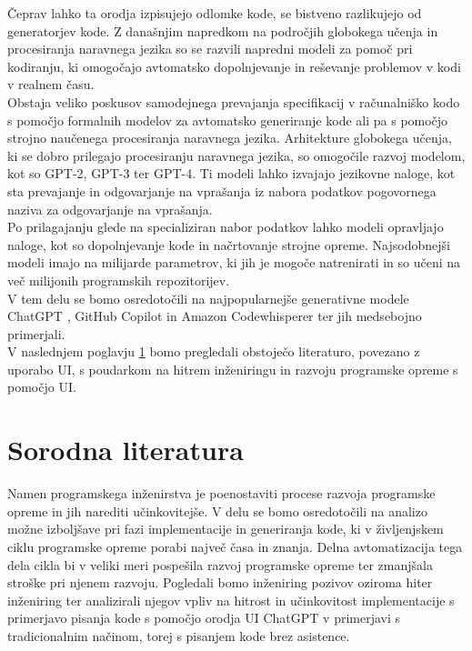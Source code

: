 \documentclass[a4paper,12pt,openright]{book}
\begin{document}
Čeprav lahko ta orodja izpisujejo odlomke kode, se bistveno razlikujejo od generatorjev kode.
Z današnjim napredkom na področjih globokega učenja in procesiranja naravnega jezika so se razvili napredni modeli za pomoč pri kodiranju, ki omogočajo avtomatsko dopolnjevanje in reševanje problemov v kodi v realnem času. \\
Obstaja veliko poskusov samodejnega prevajanja specifikacij v računalniško kodo s pomočjo formalnih modelov za avtomatsko generiranje kode ali pa s pomočjo strojno naučenega procesiranja naravnega jezika. Arhitekture globokega učenja, ki se dobro prilegajo procesiranju naravnega jezika, so omogočile razvoj modelom, kot so GPT-2, GPT-3 ter GPT-4. Ti modeli lahko izvajajo jezikovne naloge, kot sta prevajanje in odgovarjanje na vprašanja iz nabora podatkov pogovornega naziva za odgovarjanje na vprašanja. \cite{hu2019re} \\
Po prilagajanju glede na specializiran nabor podatkov lahko modeli opravljajo naloge, kot so dopolnjevanje kode in načrtovanje strojne opreme.  Najsodobnejši modeli imajo na milijarde parametrov, ki jih je mogoče natrenirati in so učeni na več milijonih programskih repozitorijev.  \cite{hu2019re} \\
V tem delu se bomo osredotočili na najpopularnejše generativne modele ChatGPT \cite{openai_chatgpt}, GitHub Copilot \cite{github_copilot} in Amazon Codewhisperer \cite{saasworthy_codewhisperer} ter jih medsebojno primerjali. \\
\pagebreak
V naslednjem poglavju \ref{char:lit} bomo pregledali obstoječo literaturo, povezano z uporabo UI, s poudarkom na hitrem inženiringu in razvoju programske opreme s pomočjo UI. 
\section{Sorodna literatura} \label{char:lit}

Namen programskega inženirstva je poenostaviti procese razvoja programske opreme in jih narediti učinkovitejše. 
V delu se bomo osredotočili na analizo možne izboljšave pri fazi implementacije in generiranja kode, ki v življenjskem ciklu programske opreme porabi največ časa in znanja. Delna avtomatizacija tega dela cikla bi v veliki meri pospešila razvoj programske opreme ter zmanjšala stroške pri njenem razvoju. Pogledali bomo inženiring pozivov oziroma hiter inženiring ter analizirali njegov vpliv na hitrost in učinkovitost implementacije s primerjavo pisanja kode s pomočjo orodja UI ChatGPT v primerjavi s tradicionalnim načinom, torej s pisanjem kode brez asistence. 
\end{document}
